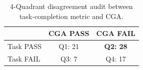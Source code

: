 \begin{table}[t]
\centering
\caption{4-Quadrant disagreement audit between task-completion metric and CGA.}
\label{tab:quadrant}
\begin{tabular}{lcc}
\toprule
 & CGA PASS & CGA FAIL \\
\midrule
Task PASS & Q1: 21 & \textbf{Q2: 28} \\
Task FAIL & Q3: 7 & Q4: 17 \\
\bottomrule
\end{tabular}
\end{table}